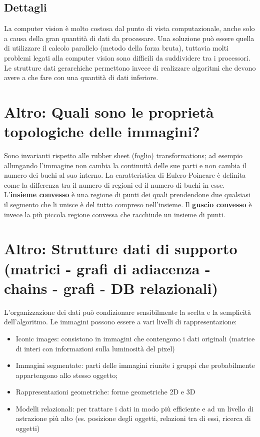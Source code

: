 \subsection{Dettagli}
La computer vision è molto costosa dal punto di vista computazionale, anche solo a causa della gran quantità di dati da processare. Una soluzione può essere quella di utilizzare il calcolo parallelo (metodo della forza bruta), tuttavia molti problemi legati alla computer vision sono difficili da suddividere tra i processori. Le strutture dati gerarchiche permettono invece di realizzare algoritmi che devono avere a che fare con una quantità di dati inferiore.

\section{Altro: Quali sono le proprietà topologiche delle immagini?}
Sono invarianti rispetto alle rubber sheet (foglio) transformations; ad esempio allungando l'immagine non cambia la continuità delle sue parti e non cambia il numero dei buchi al suo interno.
La caratteristica di Eulero-Poincare è definita come la differenza tra il numero di regioni ed il numero di buchi in esse.
L'\textbf{insieme convesso} è una regione di punti dei quali prendendone due qualsiasi il segmento che li unisce è del tutto compreso nell'insieme.
Il \textbf{guscio convesso} è invece la più piccola regione convessa che racchiude un insieme di punti.

\section{Altro: Strutture dati di supporto (matrici - grafi di adiacenza - chains - grafi - DB relazionali)}
L'organizzazione dei dati può condizionare sensibilmente la scelta e la semplicità dell'algoritmo. Le immagini possono essere a vari livelli di rappresentazione:
\begin{itemize}
	\item Iconic images: consistono in immagini che contengono i dati originali (matrice di interi con informazioni sulla luminosità del pixel)
	\item Immagini segmentate: parti delle immagini riunite i gruppi che probabilmente appartengono allo stesso oggetto;
	\item Rappresentazioni geometriche: forme geometriche 2D e 3D
	\item Modelli relazionali: per trattare i dati in modo più efficiente e ad un livello di astrazione più alto (es. posizione degli oggetti, relazioni tra di essi, ricerca di oggetti)
\end{itemize}